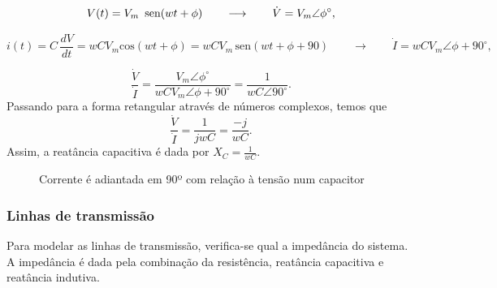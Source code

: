 \[
V(t)=V_{m}\mbox{\,\ sen}(wt+\phi)\qquad\longrightarrow\qquad\dot{V}=V_{m}\angle\phi^{\circ},
\]


\[
i(t)=C\,\frac{dV}{dt}=wCV_{m}\mbox{cos}(wt+\phi)=wCV_{m}\,\mbox{sen}(wt+\phi+90)\qquad\longrightarrow\qquad\dot{I}=wCV_{m}\angle\phi+90^{\circ},
\]


\[
\frac{\dot{V}}{\dot{I}}=\frac{V_{m}\angle\phi^{\circ}}{wCV_{m}\angle\phi+90^{\circ}}=\frac{1}{wC\angle90^{\circ}}.
\]
Passando para a forma retangular através de números complexos, temos que
\[
\frac{\dot{V}}{\dot{I}}=\frac{1}{jwC}=\frac{-j}{wC}.
\]
Assim, a reatância capacitiva é dada por $X_{C}=\frac{1}{wC}$. 

\begin{figure}[H]
\begin{center}
\caption{\label{fig:fase-ct-indutor}Corrente é adiantada em 90º com relação à tensão num capacitor}
\end{center}
\end{figure}

\subsubsection*{Linhas de transmissão}

Para modelar as linhas de transmissão, verifica-se qual a impedância do sistema. A impedância é dada pela combinação da resistência, reatância capacitiva e reatância indutiva.

